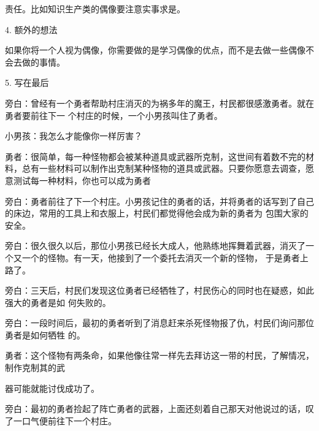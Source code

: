 \documentclass{article}
\begin{document}
责任。比如知识生产类的偶像要注意实事求是。 


4. 额外的想法 

如果你将一个人视为偶像，你需要做的是学习偶像的优点，而不是去做一些偶像不会去做的事情。
 


5. 写在最后 

旁白：曾经有一个勇者帮助村庄消灭的为祸多年的魔王，村民都很感激勇者。就在勇者要前往下一
个村庄的时候，一个小男孩叫住了勇者。 


小男孩：我怎么才能像你一样厉害？ 

勇者：很简单，每一种怪物都会被某种道具或武器所克制，这世间有着数不完的材料，总有一些材料可以制作出克制某种怪物的道具或武器。只要你愿意去调查，愿意测试每一种材料，你也可以成为勇者

\newpage

旁白：勇者前往了下一个村庄。小男孩记住的勇者的话，并将勇者的话写到了自己的床边，常用的工具上和衣服上，村民们都觉得他会成为新的勇者为
包围大家的安全。 

旁白：很久很久以后，那位小男孩已经长大成人，他熟练地挥舞着武器，消灭了一个又一个的怪物。有一天，他接到了一个委托去消灭一个新的怪物，
于是勇者上路了。 

旁白：三天后，村民们发现这位勇者已经牺牲了，村民伤心的同时也在疑惑，如此强大的勇者是如
何失败的。 

旁白：一段时间后，最初的勇者听到了消息赶来杀死怪物报了仇，村民们询问那位勇者是如何牺牲
的。 

勇者：这个怪物有两条命，如果他像往常一样先去拜访这一带的村民，了解情况，制作克制其的武

\newpage
器可能就能讨伐成功了。 

旁白：最初的勇者捡起了阵亡勇者的武器，上面还刻着自己那天对他说过的话，叹了一口气便前往下一个村庄。
\end{document}
